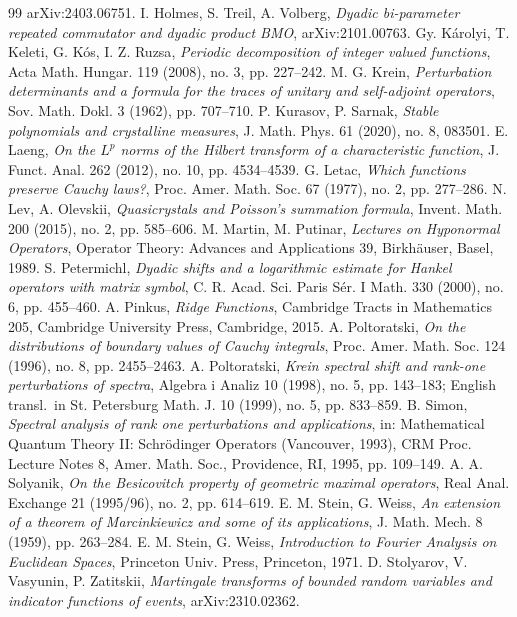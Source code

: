 \documentclass{article}
\begin{document}
\begin{thebibliography}{99}
		arXiv:2403.06751.
		{I. Holmes, S. Treil, A. Volberg},
		{\it Dyadic bi-parameter repeated commutator and dyadic product BMO},
		arXiv:2101.00763.
		{Gy. K\'arolyi, T. Keleti, G. K\'os, I. Z. Ruzsa},
		{\it Periodic decomposition of integer valued functions},
		Acta Math. Hungar. 119 (2008), no. 3, pp. 227--242.
		{M. G. Krein},
		{\it Perturbation determinants and a formula for the traces of unitary and self-adjoint operators},
		Sov. Math. Dokl. 3 (1962), pp. 707--710.
		{P. Kurasov, P. Sarnak},
		{\it Stable polynomials and crystalline measures},
		J. Math. Phys. 61 (2020), no. 8, 083501.
		{E. Laeng},
		{\it On the $L^p$ norms of the Hilbert transform of a characteristic function},
		J. Funct. Anal. 262 (2012), no. 10, pp. 4534--4539.
		{G. Letac},
		{\it Which functions preserve Cauchy laws?},
		Proc. Amer. Math. Soc. 67 (1977), no. 2, pp. 277--286.
		{N. Lev, A. Olevskii},
		{\it Quasicrystals and Poisson's summation formula},
		Invent. Math. 200 (2015), no. 2, pp. 585--606.
		{M. Martin, M. Putinar},
		{\it Lectures on Hyponormal Operators},
		Operator Theory: Advances and Applications 39, Birkh\"auser, Basel, 1989.
		{S. Petermichl},
		{\it Dyadic shifts and a logarithmic estimate for Hankel operators with matrix symbol},
		C. R. Acad. Sci. Paris S\'er. I Math. 330 (2000), no. 6, pp. 455--460.
		{A. Pinkus},
		{\it Ridge Functions},
		Cambridge Tracts in Mathematics 205, Cambridge University Press, Cambridge, 2015.
		{A. Poltoratski},
		{\it On the distributions of boundary values of Cauchy integrals},
		Proc. Amer. Math. Soc. 124 (1996), no. 8, pp. 2455--2463.
		{A. Poltoratski},
		{\it Krein spectral shift and rank-one perturbations of spectra},
		Algebra i Analiz 10 (1998), no. 5, pp. 143--183; English transl.\ in St. Petersburg Math. J. 10 (1999), no. 5, pp. 833--859.
		{B. Simon},
		{\it Spectral analysis of rank one perturbations and applications},
		in: Mathematical Quantum Theory II: Schr\"odinger Operators (Vancouver, 1993), CRM Proc. Lecture Notes 8, Amer. Math. Soc., Providence, RI, 1995, pp. 109--149.
		{A. A. Solyanik},
		{\it On the Besicovitch property of geometric maximal operators},
		Real Anal. Exchange 21 (1995/96), no. 2, pp. 614--619.
		{E. M. Stein, G. Weiss},
		{\it An extension of a theorem of Marcinkiewicz and some of its applications},
		J. Math. Mech. 8 (1959), pp. 263--284.
		{E. M. Stein, G. Weiss},
		{\it Introduction to Fourier Analysis on Euclidean Spaces},
		Princeton Univ. Press, Princeton, 1971.
		{D. Stolyarov, V. Vasyunin, P. Zatitskii},
		{\it Martingale transforms of bounded random variables and indicator functions of events},
		arXiv:2310.02362.

	\end{thebibliography}
\end{document}

